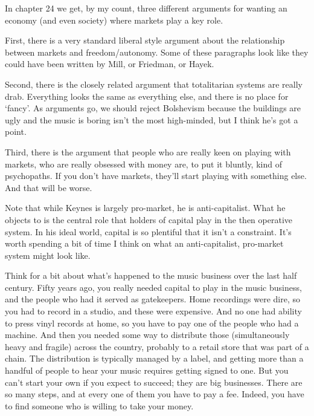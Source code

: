 \documentclass[
  11pt,
  letterpaper,
  DIV=11,
  numbers=noendperiod,
  oneside]{scrartcl}
\begin{document}
In chapter 24 we get, by my count, three different arguments for wanting
an economy (and even society) where markets play a key role.

First, there is a very standard liberal style argument about the
relationship between markets and freedom/autonomy. Some of these
paragraphs look like they could have been written by Mill, or Friedman,
or Hayek.

Second, there is the closely related argument that totalitarian systems
are really drab. Everything looks the same as everything else, and there
is no place for `fancy'. As arguments go, we should reject Bolshevism
because the buildings are ugly and the music is boring isn't the most
high-minded, but I think he's got a point.

Third, there is the argument that people who are really keen on playing
with markets, who are really obsessed with money are, to put it bluntly,
kind of psychopaths. If you don't have markets, they'll start playing
with something else. And that will be worse.

Note that while Keynes is largely pro-market, he is anti-capitalist.
What he objects to is the central role that holders of capital play in
the then operative system. In his ideal world, capital is so plentiful
that it isn't a constraint. It's worth spending a bit of time I think on
what an anti-capitalist, pro-market system might look like.

Think for a bit about what's happened to the music business over the
last half century. Fifty years ago, you really needed capital to play in
the music business, and the people who had it served as gatekeepers.
Home recordings were dire, so you had to record in a studio, and these
were expensive. And no one had ability to press vinyl records at home,
so you have to pay one of the people who had a machine. And then you
needed some way to distribute those (simultaneously heavy and fragile)
across the country, probably to a retail store that was part of a chain.
The distribution is typically managed by a label, and getting more than
a handful of people to hear your music requires getting signed to one.
But you can't start your own if you expect to succeed; they are big
businesses. There
are so many steps, and at every one of them you have to pay a fee.
Indeed, you have to find someone who is willing to take your money.
\end{document}

